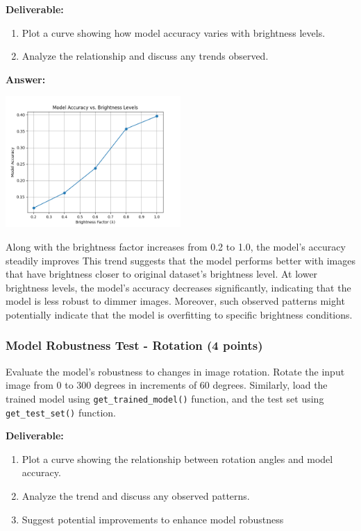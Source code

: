 \documentclass[11pt, oneside]{article}   	%
\begin{document}
\noindent\textbf{Deliverable:}

\begin{enumerate}
    \item Plot a curve showing how model accuracy varies with brightness levels.
    \item Analyze the relationship and discuss any trends observed.
\end{enumerate}


\textbf{Answer:} 
\begin{center}
    \includegraphics[width=0.5\textwidth]{report_pic/Brightness_accuracy.png}
\end{center}
Along with the brightness factor increases from 0.2 to 1.0, the model's accuracy steadily improves
This trend suggests that the model performs better with images that have brightness closer to original dataset's brightness level.
At lower brightness levels, the model's accuracy decreases significantly, indicating that the model is less robust to dimmer images.
Moreover, such observed patterns might potentially indicate that the model is overfitting to specific brightness conditions.

\subsubsection*{Model Robustness Test - Rotation (4 points)}

Evaluate the model's robustness to changes in image rotation. Rotate the input image from $0$ to $300$ degrees in increments of $60$ degrees. 
Similarly, load the trained model using \texttt{get\_trained\_model()} function, and the test set using \texttt{get\_test\_set()} function. 

\noindent\textbf{Deliverable:}

\begin{enumerate}
    \item Plot a curve showing the relationship between rotation angles and model accuracy.
    \item Analyze the trend and discuss any observed patterns.
    \item Suggest potential improvements to enhance model robustness
\end{enumerate}
\end{document}
